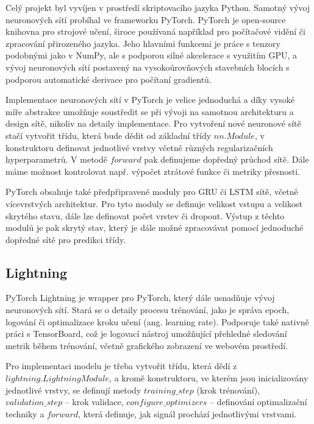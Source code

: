 Celý projekt byl vyvíjen v prostředí skriptovacího jazyka Python. Samotný vývoj
neuronových sítí probíhal ve frameworku PyTorch. PyTorch je open-source
knihovna pro strojové učení, široce používaná například pro počítačové vidění
či zpracování přirozeného jazyka. Jeho hlavními funkcemi je práce s tenzory
podobnými jako v NumPy, ale s podporou silné akcelerace s využitím GPU, a vývoj
neuronových sítí postavený na vysokoúrovňových stavebních blocích s podporou
automatické derivace pro počítaní gradientů.

Implementace neuronových sítí v PyTorch je velice jednoduchá a díky vysoké míře
abstrakce umožňuje soustředit se při vývoji na samotnou architekturu a design
sítě, nikoliv na detaily implementace. Pro vytvoření nové neuronové sítě stačí
vytvořit třídu, která bude dědit od základní třídy $nn.Module$, v konstruktoru
definovat jednotlivé vrstvy včetně různých regularizačních hyperparametrů. V
metodě $forward$ pak definujeme dopředný průchod sítě. Dále máme možnost
kontrolovat např. výpočet ztrátové funkce či metriky přesnosti.

PyTorch obsahuje také předpřipravené moduly pro GRU či LSTM sítě, včetně
vícevrstvých architektur. Pro tyto moduly se definuje velikost vstupu a
velikost skrytého stavu, dále lze definovat počet vrstev či dropout. Výstup z
těchto modulů je pak skrytý stav, který je dále možné zpracovávat pomocí
jednoduché dopředné sítě pro predikci třídy.

\subsection{Lightning}
\label{sec:Lightning}

PyTorch Lightning je wrapper pro PyTorch, který dále usnadňuje vývoj
neuronových sítí. Stará se o detaily procesu trénování, jako je správa epoch,
logování či optimalizace kroku učení (ang. learning rate). Podporuje také
nativně práci s TensorBoard, což je logovací nástroj umožňující přehledné
sledování metrik během trénování, včetně grafického zobrazení ve webovém
prostředí.

Pro implementaci modelu je třeba vytvořit třídu, která dědí z
$lightning.LightningModule$, a kromě konstruktoru, ve kterém jsou
inicializovány jednotlivé vrstvy, se definují metody $training\_step$ (krok
trénování), $validation\_step$ – krok validace, $configure\_optimizers$ –
definování optimalizační techniky a $forward$, která definuje, jak signál
prochází jednotlivými vrstvami.

